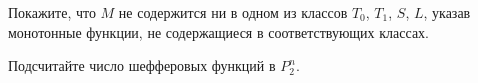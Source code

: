 \documentclass[12pt, a4paper]{article}
\begin{document}
\begin{problemList}
\bigskip

{Покажите, что $M$ не содержится ни в одном из классов $T_0$, $T_1$, $S$, $L$,
указав монотонные функции, не содержащиеся в соответствующих классах.}

\bigskip

{Подсчитайте число шефферовых функций в $P_2^n$.}

\end{problemList}
\end{document}

